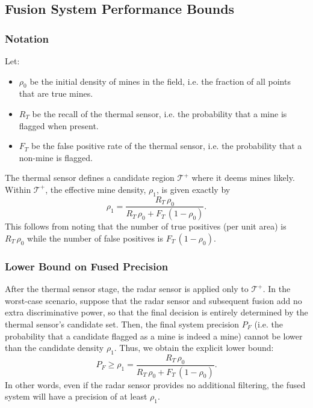 \subsection{Fusion System Performance Bounds} \label{fusion_bounds}

    \subsubsection*{Notation}
        
        Let:
        \begin{itemize}
            \item \(\rho_0\) be the initial density of mines in the field, i.e. the fraction of all points that are true mines.
            \item \(R_T\) be the recall of the thermal sensor, i.e. the probability that a mine is flagged when present.
            \item \(F_T\) be the false positive rate of the thermal sensor, i.e. the probability that a non-mine is flagged.
        \end{itemize}
        
        The thermal sensor defines a candidate region \(\mathcal{T}^+\) where it deems mines likely. Within \(\mathcal{T}^+\), the effective mine density, \(\rho_1\), is given exactly by
        \[
        \rho_1 = \frac{R_T\,\rho_0}{R_T\,\rho_0 + F_T\,(1-\rho_0)}.
        \]
        This follows from noting that the number of true positives (per unit area) is \(R_T\,\rho_0\) while the number of false positives is \(F_T\,(1-\rho_0)\).
    
    \subsubsection*{Lower Bound on Fused Precision}
    
        After the thermal sensor stage, the radar sensor is applied only to \(\mathcal{T}^+\). In the worst-case scenario, suppose that the radar sensor and subsequent fusion add no extra discriminative power, so that the final decision is entirely determined by the thermal sensor’s candidate set. Then, the final system precision \(P_F\) (i.e. the probability that a candidate flagged as a mine is indeed a mine) cannot be lower than the candidate density \(\rho_1\). Thus, we obtain the explicit lower bound:
        \[
        P_F \ge \rho_1 = \frac{R_T\,\rho_0}{R_T\,\rho_0 + F_T\,(1-\rho_0)}.
        \]
        In other words, even if the radar sensor provides no additional filtering, the fused system will have a precision of at least \(\rho_1\).
